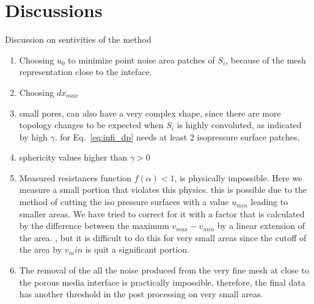 \documentclass[draft]{agujournal2019}
\begin{document}
\begin{figure}\label{fig:histogram_R}
\end{figure}


\section{Discussions}

Discussion on sentivities of the method 
\begin{enumerate}
	\item Choosing $u_0$ to minimize point noise area patches of $S_i$, because of the mesh representation close to the inteface.
	\item Choosing $dx_{max}$
	\item small pores, can also have a very complex shape, since there are more topology changes to be expected when $S_i$ is highly convoluted, as indicated by high $\gamma$. for Eq.~\ref{eq:infi_dp} needs at least 2 isopressure surface patches. 
	\item sphericity values higher than $\gamma >0$
	\item Measured resistances function $f(\alpha) < 1$, is physically impossible. Here we measure a small portion that violates this physics. this is possible due to the method of cutting the iso pressure surfaces with a value $u_{min}$ leading to smaller areas. We have tried to correct for it with a factor that is calculated by the difference between the maximum $v_{max}-v_{min}$ by a linear extension of the area.  , but it is difficult to do this for very small areas since the cutoff of the area by $v_min$ is quit a significant portion. 
	\item The removal of the all the noise produced from the very fine mesh at close to the porous media interface is practically impossible, therefore, the final data has another threshold in the post processing on very small areas.   
\end{enumerate}
\end{document}
